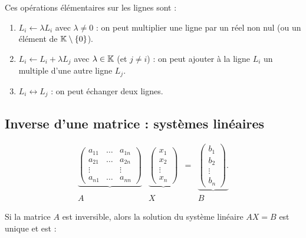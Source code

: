 \documentclass[10pt,class=article,crop=false]{standalone}
\begin{document}
\begin{multicols}{2}
Ces opérations élémentaires sur les lignes sont :
\begin{enumerate}
	\item $L_i \leftarrow \lambda L_i$ avec $\lambda \neq 0$ :
	on peut multiplier une ligne par un réel non nul (ou un élément de $\mathbb{K}\setminus\{0\}$).
	
	\item $L_i \leftarrow L_i+\lambda L_j$ avec $\lambda \in \mathbb{K}$ (et $j\neq i$) :
	on peut ajouter à la ligne $L_i$ un multiple d'une autre ligne $L_j$.
	
	\item $L_i \leftrightarrow L_j$ : on peut échanger deux lignes.
\end{enumerate}



\subsection{Inverse d'une matrice : systèmes linéaires}

\begin{equation*}\begin{array}{cccc}
		\underbrace{
			\left(
			\begin{array}{ccc}
				a_{11} & \dots & a_{1n}\\
				a_{21} & \dots & a_{2n}\\
				\vdots &&\vdots\\
				a_{n1} &\dots & a_{nn}
			\end{array}
			\right)
		}
		&
		\underbrace{
			\left(
			\begin{array}{c}
				x_1\\
				x_2\\
				\vdots\\
				x_n
			\end{array}
			\right)
		}
		& = &
		\underbrace{
			\left(
			\begin{array}{c}
				b_1\\
				b_2\\
				\vdots\\
				b_n
			\end{array}
			\right).
		}
		\\
		A & X & & B
\end{array}\end{equation*}


\begin{proposition}
	Si la matrice $A$ est inversible, alors
	la solution du système linéaire $AX=B$ est unique et est :
\end{proposition}






\end{multicols}
\end{document}
